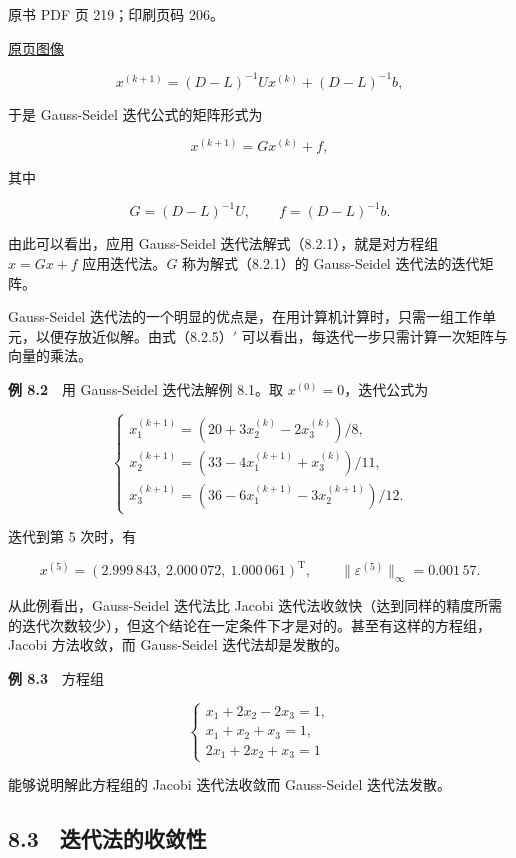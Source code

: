 \clearpage

原书 PDF 页 219；印刷页码 206。

\href{source-images/pdf-219.jpeg}{原页图像}

\[
x^{(k+1)}=(D-L)^{-1}Ux^{(k)}+(D-L)^{-1}b,
\]

于是 Gauss-Seidel 迭代公式的矩阵形式为

\[
x^{(k+1)}=Gx^{(k)}+f,
\tag{8.2.6}
\]

其中

\[
G=(D-L)^{-1}U,\qquad f=(D-L)^{-1}b.
\]

由此可以看出，应用 Gauss-Seidel 迭代法解式（8.2.1），就是对方程组 \(x=Gx+f\) 应用迭代法。\(G\) 称为解式（8.2.1）的 Gauss-Seidel 迭代法的迭代矩阵。

Gauss-Seidel 迭代法的一个明显的优点是，在用计算机计算时，只需一组工作单元，以便存放近似解。由式（8.2.5）\('\) 可以看出，每迭代一步只需计算一次矩阵与向量的乘法。

\textbf{例 8.2}　用 Gauss-Seidel 迭代法解例 8.1。取 \(x^{(0)}=0\)，迭代公式为

\[
\begin{cases}
x_1^{(k+1)}=(20+3x_2^{(k)}-2x_3^{(k)})/8,\\
x_2^{(k+1)}=(33-4x_1^{(k+1)}+x_3^{(k)})/11,\\
x_3^{(k+1)}=(36-6x_1^{(k+1)}-3x_2^{(k+1)})/12.
\end{cases}
\]

迭代到第 5 次时，有

\[
x^{(5)}=(2.999\,843,\ 2.000\,072,\ 1.000\,061)^{\mathrm T},\qquad
\|\varepsilon^{(5)}\|_\infty=0.001\,57.
\]

从此例看出，Gauss-Seidel 迭代法比 Jacobi 迭代法收敛快（达到同样的精度所需的迭代次数较少），但这个结论在一定条件下才是对的。甚至有这样的方程组，Jacobi 方法收敛，而 Gauss-Seidel 迭代法却是发散的。

\textbf{例 8.3}　方程组

\[
\begin{cases}
x_1+2x_2-2x_3=1,\\
x_1+x_2+x_3=1,\\
2x_1+2x_2+x_3=1
\end{cases}
\]

能够说明解此方程组的 Jacobi 迭代法收敛而 Gauss-Seidel 迭代法发散。

\subsection{8.3　迭代法的收敛性}\label{ch08-ux8fedux4ee3ux6cd5ux7684ux6536ux655bux6027}

